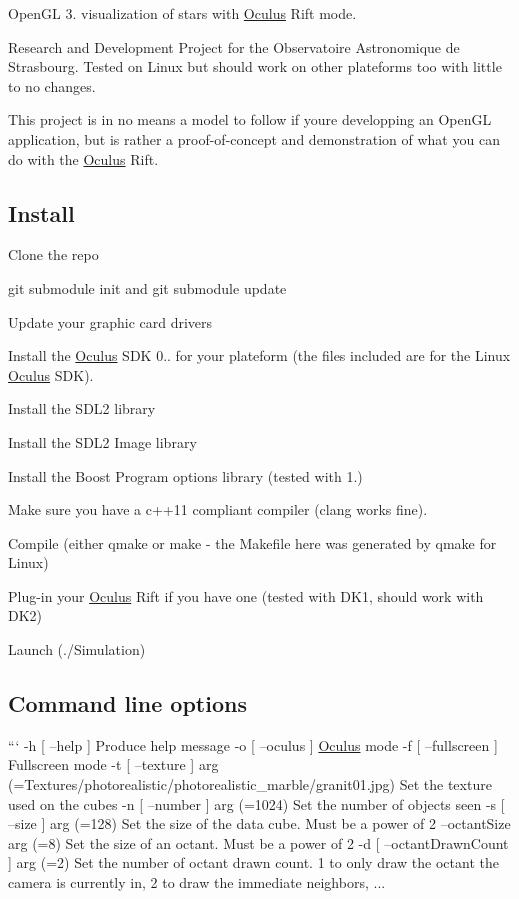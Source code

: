 Open\+G\+L 3. visualization of stars with \hyperlink{classOculus}{Oculus} Rift mode.

Research and Development Project for the Observatoire Astronomique de Strasbourg. Tested on Linux but should work on other plateforms too with little to no changes.

This project is in no means a model to follow if you\textquotesingle{}re developping an Open\+G\+L application, but is rather a proof-\/of-\/concept and demonstration of what you can do with the \hyperlink{classOculus}{Oculus} Rift.

\subsection*{Install}


\begin{DoxyItemize}
\item Clone the repo
\item {\ttfamily git submodule init} and {\ttfamily git submodule update}
\item Update your graphic card drivers
\item Install the \hyperlink{classOculus}{Oculus} S\+D\+K 0.. for your plateform (the files included are for the Linux \hyperlink{classOculus}{Oculus} S\+D\+K).
\item Install the S\+D\+L2 library
\item Install the S\+D\+L2 Image library
\item Install the Boost Program options library (tested with 1.)
\item Make sure you have a c++11 compliant compiler (clang works fine).
\item Compile (either qmake or make -\/ the Makefile here was generated by qmake for Linux)
\item Plug-\/in your \hyperlink{classOculus}{Oculus} Rift if you have one (tested with D\+K1, should work with D\+K2)
\item Launch (./\+Simulation)
\end{DoxyItemize}

\subsection*{Command line options}

``` -\/h \mbox{[} --help \mbox{]} Produce help message -\/o \mbox{[} --oculus \mbox{]} \hyperlink{classOculus}{Oculus} mode -\/f \mbox{[} --fullscreen \mbox{]} Fullscreen mode -\/t \mbox{[} --texture \mbox{]} arg (=Textures/photorealistic/photorealistic\+\_\+marble/granit01.\+jpg) Set the texture used on the cubes -\/n \mbox{[} --number \mbox{]} arg (=1024) Set the number of objects seen -\/s \mbox{[} --size \mbox{]} arg (=128) Set the size of the data cube. Must be a power of 2 --octant\+Size arg (=8) Set the size of an octant. Must be a power of 2 -\/d \mbox{[} --octant\+Drawn\+Count \mbox{]} arg (=2) Set the number of octant drawn count. 1 to only draw the octant the camera is currently in, 2 to draw the immediate neighbors, ...

